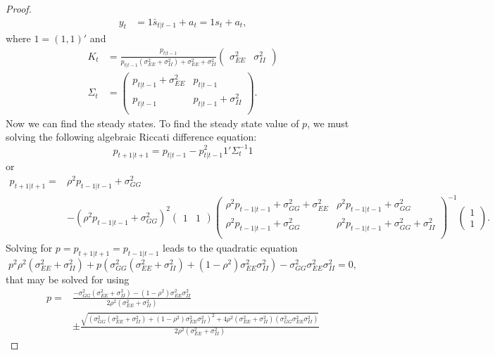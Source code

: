 \documentclass[oneside,reqno]{amsart}
\theoremstyle{definition}
\begin{document}
\begin{enumerate}[label=(\roman*)]
\begin{proof}
\begin{align*}
	y_t &= 1 \bar s_{t|t-1} + a_t = 1 s_t + a_t,
\end{align*}
where $1 = (1,1)'$ and 
\begin{align*}
	K_t &= \frac{p_{t|t-1}}{p_{t|t-1}(\sigma_{EE}^2 + \sigma_{II}^2) + \sigma_{EE}^2 + \sigma_{II}^2} \begin{pmatrix} \sigma_{EE}^2 & \sigma_{II}^2 \end{pmatrix} \\
	\Sigma_t &= \begin{pmatrix}
			p_{t|t-1} + \sigma_{EE}^2 & p_{t|t-1} \\
			p_{t|t-1}  & p_{t|t-1} + \sigma_{II}^2 \\
		\end{pmatrix}.
\end{align*}
Now we can find the steady states. To find the steady state value of $p$, we must solving the following algebraic Riccati difference equation: 
\[
	 p_{t+1|t+1} = p_{t|t-1} - p_{t|t-1}^2 1' \Sigma_t^{-1} 1
\]
or 
\begin{align*}
	 p_{t+1|t+1} ={}&  \rho^2 p_{t-1|t-1} + \sigma_{GG}^2 \\
	 &- (\rho^2 p_{t-1|t-1} + \sigma_{GG}^2)^2 
	\begin{pmatrix} 1 & 1 \end{pmatrix}   
	    \begin{pmatrix}
		\rho^2 p_{t-1|t-1} + \sigma_{GG}^2 + \sigma_{EE}^2 & \rho^2 p_{t-1|t-1} + \sigma_{GG}^2 \\
		\rho^2 p_{t-1|t-1} + \sigma_{GG}^2  & \rho^2 p_{t-1|t-1} + \sigma_{GG}^2 + \sigma_{II}^2 \\
		\end{pmatrix}^{-1}
	\begin{pmatrix} 1 \\ 1 \end{pmatrix}.
\end{align*}
Solving for $p = p_{t+1|t+1}= p_{t-1|t-1}$ leads to the quadratic equation
\[
	p^2 \rho^2 (\sigma_{EE}^2 + \sigma_{II}^2) + p \left(\sigma_{GG}^2(\sigma_{EE}^2 + \sigma_{II}^2) + (1-\rho^2) \sigma_{EE}^2 \sigma_{II}^2 \right) - \sigma_{GG}^2\sigma_{EE}^2\sigma_{II}^2 = 0,
\]
that may be solved for using
\begin{align*}
	p =&{} \frac{-\sigma_{GG}^2(\sigma_{EE}^2 + \sigma_{II}^2) - (1-\rho^2) \sigma_{EE}^2 \sigma_{II}^2}{2 \rho^2 (\sigma_{EE}^2 + \sigma_{II}^2)} \\
	& \pm \frac{\sqrt{( \sigma_{GG}^2(\sigma_{EE}^2 + \sigma_{II}^2) + (1-\rho^2) \sigma_{EE}^2 \sigma_{II}^2 )^2 + 4 \rho^2 (\sigma_{EE}^2 + \sigma_{II}^2)(\sigma_{GG}^2\sigma_{EE}^2\sigma_{II}^2)}}{2 \rho^2 (\sigma_{EE}^2 + \sigma_{II}^2)}

\end{align*}
\end{proof}
\end{enumerate}
\end{document}
